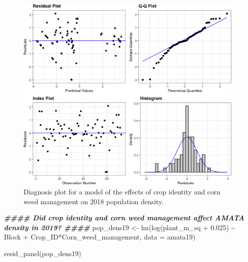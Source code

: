 \documentclass[
]{article}
\newenvironment{Shaded}{\begin{snugshade}}{\end{snugshade}}
\newcommand{\AttributeTok}[1]{\textcolor[rgb]{0.77,0.63,0.00}{#1}}
\newcommand{\DocumentationTok}[1]{\textcolor[rgb]{0.56,0.35,0.01}{\textbf{\textit{#1}}}}
\newcommand{\FloatTok}[1]{\textcolor[rgb]{0.00,0.00,0.81}{#1}}
\newcommand{\FunctionTok}[1]{\textcolor[rgb]{0.00,0.00,0.00}{#1}}
\newcommand{\NormalTok}[1]{#1}
\newcommand{\OtherTok}[1]{\textcolor[rgb]{0.56,0.35,0.01}{#1}}
\newcommand{\SpecialCharTok}[1]{\textcolor[rgb]{0.00,0.00,0.00}{#1}}
\begin{document}
\begin{figure}
\includegraphics[width=1\linewidth]{AppendixC_model_diagnosis_files/figure-latex/pop-dens-18-1} \caption{Diagnosis plot for a model of the effects of crop identity and corn weed management on 2018 population density.}\label{fig:pop-dens-18}
\end{figure}

\begin{Shaded}
\begin{Highlighting}[]
\DocumentationTok{\#\#\#\# Did crop identity and corn weed management affect AMATA density in 2019? \#\#\#\#}
\NormalTok{pop\_dens19 }\OtherTok{\textless{}{-}} \FunctionTok{lm}\NormalTok{(}\FunctionTok{log}\NormalTok{(plant\_m\_sq }\SpecialCharTok{+} \FloatTok{0.025}\NormalTok{) }\SpecialCharTok{\textasciitilde{}}\NormalTok{ Block }\SpecialCharTok{+}\NormalTok{ Crop\_ID}\SpecialCharTok{*}\NormalTok{Corn\_weed\_management,}
                   \AttributeTok{data =}\NormalTok{ amata19)}

\FunctionTok{resid\_panel}\NormalTok{(pop\_dens19) }
\end{Highlighting}
\end{Shaded}
\end{document}
